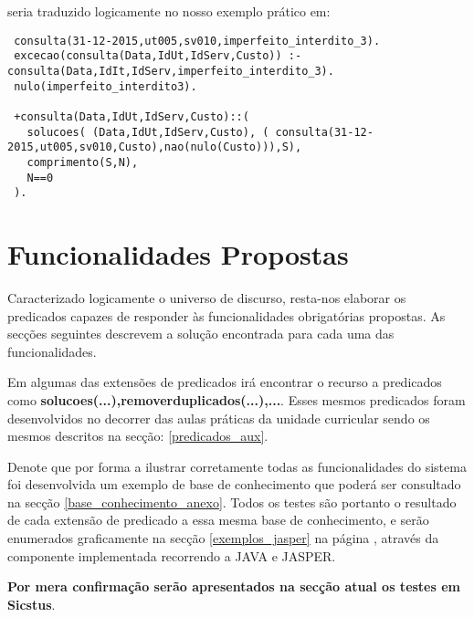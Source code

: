 \documentclass[
  oneside,
  10pt, a4paper,
  footinclude=true,
  headinclude=true,
  cleardoublepage=empty
]{scrbook}
\begin{document}
seria traduzido logicamente  no nosso exemplo prático em:

\begin{lstlisting}
 consulta(31-12-2015,ut005,sv010,imperfeito_interdito_3).
 excecao(consulta(Data,IdUt,IdServ,Custo)) :- consulta(Data,IdIt,IdServ,imperfeito_interdito_3).
 nulo(imperfeito_interdito3).
 
 +consulta(Data,IdUt,IdServ,Custo)::(
   solucoes( (Data,IdUt,IdServ,Custo), ( consulta(31-12-2015,ut005,sv010,Custo),nao(nulo(Custo))),S),
   comprimento(S,N),
   N==0
 ).
 \end{lstlisting}   














     
        
        
        

    \section{Funcionalidades Propostas}
Caracterizado logicamente o universo de discurso, resta-nos elaborar os predicados capazes de responder às funcionalidades obrigatórias propostas. As  secções seguintes descrevem a solução encontrada para cada uma das funcionalidades. \par Em algumas das extensões de predicados irá encontrar o recurso a predicados como \textbf{solucoes(...),removerduplicados(...),...}. Esses mesmos predicados foram desenvolvidos no decorrer das aulas práticas da unidade curricular sendo os mesmos descritos na secção:  \ref{predicados_aux}.\par 
Denote que por forma a ilustrar corretamente todas as funcionalidades do sistema foi desenvolvida um exemplo de base de conhecimento que poderá ser consultado na secção \ref{base_conhecimento_anexo}. Todos os testes são portanto o resultado de cada extensão de predicado a essa mesma base de conhecimento, e serão enumerados graficamente na secção \ref{exemplos_jasper} na página \pageref{exemplos_jasper}, através da componente implementada recorrendo a JAVA e JASPER. \par 
\textbf{Por mera confirmação serão apresentados na secção atual os testes em Sicstus}.\par 
\end{document}
